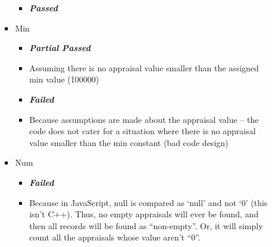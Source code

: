 \begin{itemize}
\begin{itemize}
\begin{itemize}
\begin{itemize}
						\item \color{green}
\textbf{\small \emph{Passed}} \\\color{black}
					\end{itemize}
				\item Min
					\begin{itemize}
						\item \color{myOrange}
\textbf{\small \emph{Partial Passed}} \\\color{black}
						\item Assuming there is no appraisal value smaller than the assigned min value (100000)
						\item  \color{red}
\textbf{\small \emph{Failed}} \\\color{black}
						\item Because assumptions are made about the appraisal value – the code does not cater for a situation where there is no appraisal value smaller than the min constant (bad code design) 
					\end{itemize}
				\item Num
					\begin{itemize}
						\item \color{red}
\textbf{\small \emph{Failed}} \\\color{black}
						\item Because in JavaScript, null is compared as ‘null’ and not ‘0’ (this isn’t C++). Thus, no empty appraisals will ever be found, and then all records will be found as “non-empty”. Or, it will simply count all the appraisals whose value aren’t “0”.
					\end{itemize}
			\end{itemize}
	\end{itemize}
\end{itemize}



